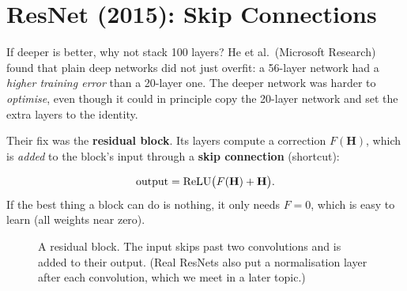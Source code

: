 \documentclass[12pt, a4paper]{article}
\providecommand{\bH}{\mathbf{H}}
\begin{document}
\section{ResNet (2015): Skip Connections}

If deeper is better, why not stack 100 layers? He et al.\ (Microsoft
Research) found that plain deep networks did not just overfit: a 56-layer
network had a \emph{higher training error} than a 20-layer one. The deeper
network was harder to \emph{optimise}, even though it could in principle
copy the 20-layer network and set the extra layers to the identity.

Their fix was the \textbf{residual block}. Its layers compute a correction
$F(\bH)$, which is \emph{added} to the block's input through a
\textbf{skip connection} (shortcut):
\begin{resultbox}
  \[
    \text{output} = \relu\bigl(F(\bH) + \bH\bigr).
  \]
  If the best thing a block can do is nothing, it only needs $F = 0$, which
  is easy to learn (all weights near zero).
\end{resultbox}

\begin{figure}[H]
  \centering
  \caption{A residual block. The input skips past two convolutions and is
    added to their output. (Real ResNets also put a normalisation layer after
    each convolution, which we meet in a later topic.)}
  \label{fig:resblock}
\end{figure}
\end{document}

